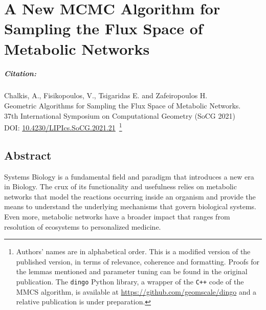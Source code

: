 % 
% 



\newtheorem{thm}{Theorem}
\newtheorem{lem}[thm]{Lemma}
\newtheorem{remark}[thm]{Remark}


\chapter{A New MCMC Algorithm for Sampling the Flux Space of Metabolic Networks}
\label{chap:dingo}


\paragraph{Citation:}
Chalkis, A., Fisikopoulos, V., Tsigaridas E. and Zafeiropoulos H.\\ 
Geometric Algorithms for Sampling the Flux Space of Metabolic Networks. \\ 
37th International Symposium on Computational Geometry (SoCG 2021) \\ 
DOI: \href{https://drops.dagstuhl.de/opus/volltexte/2021/13820/}{10.4230/LIPIcs.SoCG.2021.21}~\footnote{
   Authors' names are in alphabetical order. 
   This is a modified version of the published version,
   in terms of relevance, coherence and formatting.
   Proofs for the lemmas mentioned and parameter tuning can be found in the original publication.
   The \texttt{dingo} Python library, a wrapper of the \texttt{C++} code 
   of the MMCS algorithm, is available at 
   \href{https://github.com/geomscale/dingo}{https://github.com/geomscale/dingo}
   and a relative publication is under preparation. 
}


\section{Abstract}
\label{sec:mmcs-abstract}

   Systems Biology is a fundamental field and paradigm that introduces a new era in Biology.
   The crux of its functionality and usefulness relies on metabolic networks
   that model the reactions occurring inside an organism
   and provide the means to understand the underlying mechanisms that govern biological systems.
   Even more, metabolic networks have a broader impact that ranges from
   resolution of ecosystems to personalized medicine.

